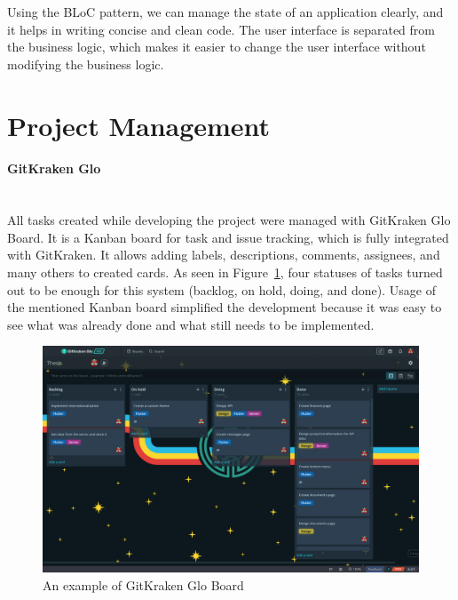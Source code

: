 Using the BLoC pattern, we can manage the state of an application clearly, and it helps in writing concise and clean code. The user interface is separated from the business logic, which makes it easier to change the user interface without modifying the business logic.~\cite{bloc-pattern}


\section{Project Management}
\paragraph{\large{GitKraken Glo}}\mbox{}\\[2pt]
All tasks created while developing the project were managed with GitKraken Glo Board. It is a Kanban board for task and issue tracking, which is fully integrated with GitKraken. It allows adding labels, descriptions, comments, assignees, and many others to created cards. As seen in Figure~\ref{fig:glo-board}, four statuses of tasks turned out to be enough for this system (backlog, on hold, doing, and done). Usage of the mentioned Kanban board simplified the development because it was easy to see what was already done and what still needs to be implemented.

\begin{figure}[htb]
    \centering
    \includegraphics[width=.98\textwidth]{fig04/glo_board.png}
    \caption{An example of GitKraken Glo Board} \label{fig:glo-board}
\end{figure}

